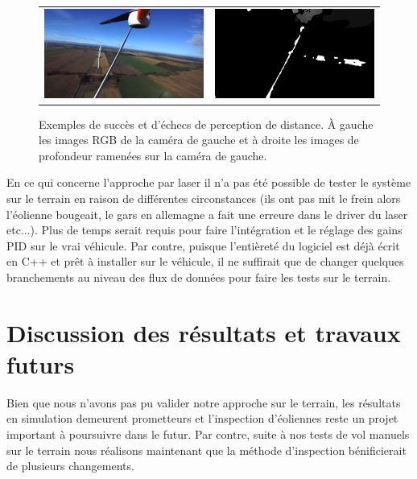 \begin{figure}
\begin{tabular}{cc}
    \includegraphics[width=0.5\linewidth]{images/field_stereo_success_rgb2.png} &
    \includegraphics[width=0.5\linewidth]{images/field_stereo_success_pcl2.png} \\
  \end{tabular}
  \caption{Exemples de succès et d'échecs de perception de distance. À gauche les images RGB de la caméra de gauche et à droite les images de profondeur ramenées sur la caméra de gauche.}
  \label{fig:field_stereo_fail}
\end{figure}

\color{red}
En ce qui concerne l'approche par laser il n'a pas été possible de tester le système sur le terrain en raison de différentes circonstances (ils ont pas mit le frein alors l'éolienne bougeait, le gars en allemagne a fait une erreure dans le driver du laser etc...). Plus de temps serait requis pour faire l'intégration et le réglage des gains PID sur le vrai véhicule. Par contre, puisque l'entièreté du logiciel est déjà écrit en C++ et prêt à installer sur le véhicule, il ne suffirait que de changer quelques branchements au niveau des flux de données pour faire les tests sur le terrain.
\color{black}

\clearpage
\section{Discussion des résultats et travaux futurs}

Bien que nous n'avons pas pu valider notre approche sur le terrain, les résultats en simulation demeurent prometteurs et l'inspection d'éoliennes reste un projet important à poursuivre dans le futur. Par contre, suite à nos tests de vol manuels sur le terrain nous réalisons maintenant que la méthode d'inspection bénificierait de plusieurs changements.

